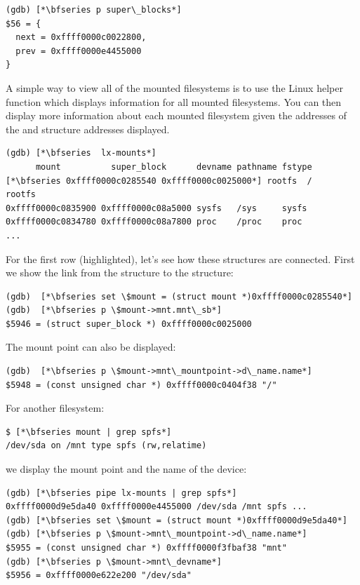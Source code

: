 \begin{lstlisting}
(gdb) [*\bfseries p super\_blocks*]
$56 = {
  next = 0xffff0000c0022800,
  prev = 0xffff0000e4455000
}
\end{lstlisting}

\noindent
A simple way to view all of the mounted filesystems is to use the Linux helper function  which displays information for all mounted filesystems. You can then display more information about each mounted filesystem given the addresses of the  and  structure addresses displayed.

\begin{lstlisting}
(gdb) [*\bfseries  lx-mounts*]
      mount          super_block      devname pathname fstype
[*\bfseries 0xffff0000c0285540 0xffff0000c0025000*] rootfs  /        rootfs 
0xffff0000c0835900 0xffff0000c08a5000 sysfs   /sys     sysfs
0xffff0000c0834780 0xffff0000c08a7800 proc    /proc    proc
...
\end{lstlisting}

\noindent
For the first row (highlighted), let's see how these structures are connected. First we show the link from the  structure to the  structure:

\begin{lstlisting}
(gdb)  [*\bfseries set \$mount = (struct mount *)0xffff0000c0285540*]
(gdb)  [*\bfseries p \$mount->mnt.mnt\_sb*]
$5946 = (struct super_block *) 0xffff0000c0025000
\end{lstlisting}

\noindent
The mount point can also be displayed:

\begin{lstlisting}
(gdb)  [*\bfseries p \$mount->mnt\_mountpoint->d\_name.name*]
$5948 = (const unsigned char *) 0xffff0000c0404f38 "/"
\end{lstlisting}

\noindent
For another filesystem:

\begin{lstlisting}
$ [*\bfseries mount | grep spfs*]
/dev/sda on /mnt type spfs (rw,relatime)
\end{lstlisting}

\noindent
we display the mount point and the name of the device:

\begin{lstlisting}
(gdb) [*\bfseries pipe lx-mounts | grep spfs*]
0xffff0000d9e5da40 0xffff0000e4455000 /dev/sda /mnt spfs ...
(gdb) [*\bfseries set \$mount = (struct mount *)0xffff0000d9e5da40*]
(gdb) [*\bfseries p \$mount->mnt\_mountpoint->d\_name.name*]
$5955 = (const unsigned char *) 0xffff0000f3fbaf38 "mnt"
(gdb) [*\bfseries p \$mount->mnt\_devname*]
$5956 = 0xffff0000e622e200 "/dev/sda"
\end{lstlisting}

